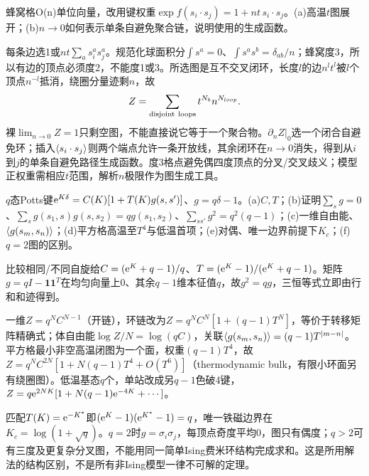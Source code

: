 \begin{exercise}[原题1(a),(b)]\label{r:334-3-1}
蜂窝格O(n)单位向量，改用键权重$\exp f(s_i\cdot s_j)=1+nt\,s_i\cdot s_j$。(a)高温$t$图展开；(b)$n\to0$如何表示单条自避免聚合链，说明使用的生成函数。
\end{exercise}
\begin{solution}
每条边选1或$nt\sum_as_i^as_j^a$。规范化球面积分$\int s^a=0$、$\int s^as^b=\delta_{ab}/n$；蜂窝度3，所以有边的顶点必须度2，不能度1或3。所选图是互不交叉闭环，长度$l$的边$n^lt^l$被$l$个顶点$n^{-l}$抵消，绕圈分量迹剩$n$，故
\begin{equation}
Z=\sum_{\rm disjoint\ loops}t^{N_b}n^{N_{loop}}.
\end{equation}
裸$\lim_{n\to0}Z=1$只剩空图，不能直接说它等于一个聚合物。$\partial_n Z|_0$选一个闭合自避免环；插入$\langle s_i\cdot s_j\rangle$则两个端点允许一条开放线，其余闭环在$n\to0$消失，得到从$i$到$j$的单条自避免路径生成函数。度3格点避免偶四度顶点的分叉/交叉歧义；模型正权重需相应$t$范围，解析$n$极限作为图生成工具。
\end{solution}
\begin{exercise}[原题2(a)--(f)]\label{r:334-3-2}
$q$态Potts键$\mathrm e^{K\delta}=C(K)[1+T(K)g(s,s')]$、$g=q\delta-1$。(a)$C,T$；(b)证明$\sum_sg=0$、$\sum_sg(s_1,s)g(s,s_2)=qg(s_1,s_2)$、$\sum_{ss'}g^2=q^2(q-1)$；(c)一维自由能、$\langle g(s_m,s_n)\rangle$；(d)平方格高温至$T^4$与低温首项；(e)对偶、唯一边界前提下$K_c$；(f)$q=2$图的区别。
\end{exercise}
\begin{solution}
比较相同/不同自旋给$C=(\mathrm e^K+q-1)/q$、$T=(\mathrm e^K-1)/(\mathrm e^K+q-1)$。矩阵$g=qI-\mathbf1\mathbf1^T$在均匀向量上0、其余$q-1$维本征值$q$，故$g^2=qg$，三恒等式立即由行和和迹得到。

一维$Z=q^NC^{N-1}$（开链），环链改为$Z=q^NC^N[1+(q-1)T^N]$，等价于转移矩阵精确式；体自由能$\log Z/N=\log(qC)$，关联$\langle g(s_m,s_n)\rangle=(q-1)T^{|m-n|}$。平方格最小非空高温闭图为一个面，权重$(q-1)T^4$，故$Z=q^NC^{2N}[1+N(q-1)T^4+O(T^6)]$（thermodynamic bulk，有限小环面另有绕圈图）。低温基态$q$个，单站改成另$q-1$色破4键，$Z=q\mathrm e^{2NK}[1+N(q-1)\mathrm e^{-4K}+\cdots]$。

匹配$T(K)=\mathrm e^{-K^*}$即$(\mathrm e^K-1)(\mathrm e^{K^*}-1)=q$，唯一铁磁边界在$K_c=\log(1+\sqrt q)$。$q=2$时$g=\sigma_i\sigma_j$，每顶点奇度平均0，图只有偶度；$q>2$可有三度及更复杂分叉图，不能用同一简单Ising费米环结构完成求和。这是所用解法的结构区别，不是所有非Ising模型一律不可解的定理。
\end{solution}
